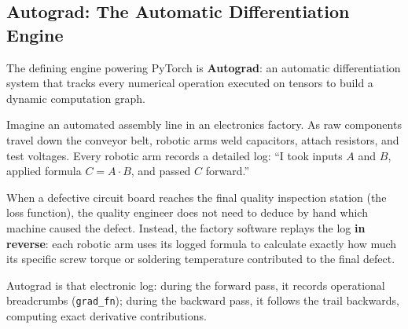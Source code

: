 \subsection{Autograd: The Automatic Differentiation Engine}\label{subsec:autograd}

The defining engine powering PyTorch is \textbf{Autograd}: an automatic differentiation system that tracks every numerical operation executed on tensors to build a dynamic computation graph.

\begin{analogy}
Imagine an automated assembly line in an electronics factory. As raw components travel down the conveyor belt, robotic arms weld capacitors, attach resistors, and test voltages. Every robotic arm records a detailed log: ``I took inputs $A$ and $B$, applied formula $C = A \cdot B$, and passed $C$ forward.''

When a defective circuit board reaches the final quality inspection station (the loss function), the quality engineer does not need to deduce by hand which machine caused the defect. Instead, the factory software replays the log \textbf{in reverse}: each robotic arm uses its logged formula to calculate exactly how much its specific screw torque or soldering temperature contributed to the final defect.

Autograd is that electronic log: during the forward pass, it records operational breadcrumbs (\texttt{grad\_fn}); during the backward pass, it follows the trail backwards, computing exact derivative contributions.
\end{analogy}


